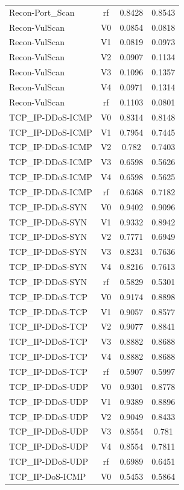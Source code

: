 \begin{table}[htbp]
\begin{tabular}{lccc}
Recon-Port\_Scan & rf & 0.8428 & 0.8543 \\
Recon-VulScan & V0 & 0.0854 & 0.0818 \\
Recon-VulScan & V1 & 0.0819 & 0.0973 \\
Recon-VulScan & V2 & 0.0907 & 0.1134 \\
Recon-VulScan & V3 & 0.1096 & 0.1357 \\
Recon-VulScan & V4 & 0.0971 & 0.1314 \\
Recon-VulScan & rf & 0.1103 & 0.0801 \\
TCP\_IP-DDoS-ICMP & V0 & 0.8314 & 0.8148 \\
TCP\_IP-DDoS-ICMP & V1 & 0.7954 & 0.7445 \\
TCP\_IP-DDoS-ICMP & V2 & 0.782 & 0.7403 \\
TCP\_IP-DDoS-ICMP & V3 & 0.6598 & 0.5626 \\
TCP\_IP-DDoS-ICMP & V4 & 0.6598 & 0.5625 \\
TCP\_IP-DDoS-ICMP & rf & 0.6368 & 0.7182 \\
TCP\_IP-DDoS-SYN & V0 & 0.9402 & 0.9096 \\
TCP\_IP-DDoS-SYN & V1 & 0.9332 & 0.8942 \\
TCP\_IP-DDoS-SYN & V2 & 0.7771 & 0.6949 \\
TCP\_IP-DDoS-SYN & V3 & 0.8231 & 0.7636 \\
TCP\_IP-DDoS-SYN & V4 & 0.8216 & 0.7613 \\
TCP\_IP-DDoS-SYN & rf & 0.5829 & 0.5301 \\
TCP\_IP-DDoS-TCP & V0 & 0.9174 & 0.8898 \\
TCP\_IP-DDoS-TCP & V1 & 0.9057 & 0.8577 \\
TCP\_IP-DDoS-TCP & V2 & 0.9077 & 0.8841 \\
TCP\_IP-DDoS-TCP & V3 & 0.8882 & 0.8688 \\
TCP\_IP-DDoS-TCP & V4 & 0.8882 & 0.8688 \\
TCP\_IP-DDoS-TCP & rf & 0.5907 & 0.5997 \\
TCP\_IP-DDoS-UDP & V0 & 0.9301 & 0.8778 \\
TCP\_IP-DDoS-UDP & V1 & 0.9389 & 0.8896 \\
TCP\_IP-DDoS-UDP & V2 & 0.9049 & 0.8433 \\
TCP\_IP-DDoS-UDP & V3 & 0.8554 & 0.781 \\
TCP\_IP-DDoS-UDP & V4 & 0.8554 & 0.7811 \\
TCP\_IP-DDoS-UDP & rf & 0.6989 & 0.6451 \\
TCP\_IP-DoS-ICMP & V0 & 0.5453 & 0.5864 \\

\end{tabular}
\end{table}
